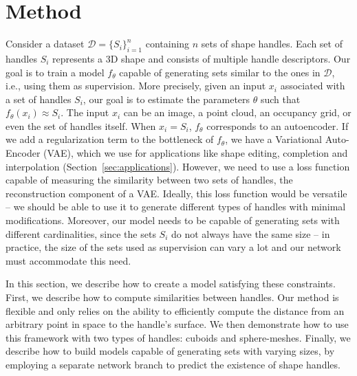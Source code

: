\section{Method}
\label{hand:method}
Consider a dataset $\mathcal{D} = \{S_i\}_{i=1}^{n}$ containing $n$ sets of
shape handles.
Each set of handles $S_i$ represents a 3D shape and consists of multiple handle descriptors.
Our goal is to train a model $f_\theta$ capable of generating sets similar to the ones in
$\mathcal{D}$, i.e., using them as supervision.
More precisely, given an input $x_i$ associated with a set of handles $S_i$, our goal is to
estimate the parameters $\theta$ such that $f_\theta(x_i) \approx S_i$.
The input $x_i$ can be an image, a point cloud, an occupancy grid, or even the set of
handles itself.
When $x_i=S_i$, $f_\theta$ corresponds to an autoencoder.
If we add a regularization term to the bottleneck of $f_\theta$,
we have a Variational Auto-Encoder (VAE), which we use for
applications like shape editing, completion and interpolation (Section~\ref{sec:applications}).
However, we need to use a loss function capable of measuring the
similarity between two sets of handles, \ie the reconstruction component of a VAE.
Ideally, this loss function would be versatile -- we should be able to use it
to generate different types of handles with minimal modifications.
Moreover, our model needs to be capable of generating sets with different cardinalities,
since the sets $S_i$ do not always have the same size -- in practice,
the size of the sets used as supervision can vary a lot and our network must accommodate this need.

In this section, we describe how to create a model satisfying these constraints.
First, we describe how to compute similarities between handles.
Our method is flexible and only relies on the ability to efficiently compute the
distance from an arbitrary point in space to the handle's surface.
We then demonstrate how to use this framework with two types of handles:
cuboids and sphere-meshes.
Finally, we describe how to build models capable of generating sets with varying sizes, 
by employing a separate network branch to predict the existence of shape handles.



